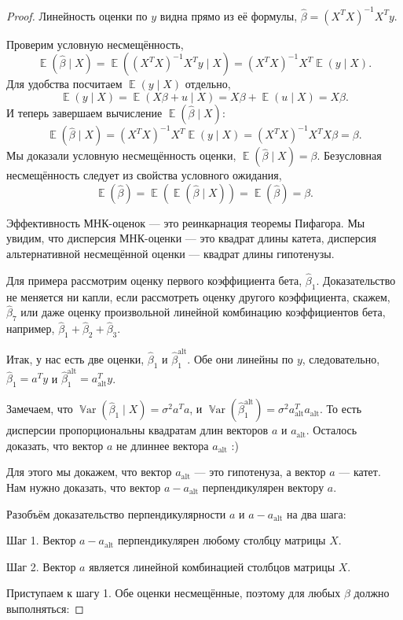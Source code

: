 \documentclass[12pt]{article}
\DeclareMathOperator{\Var}{\mathbb{V}ar}
\DeclareMathOperator{\E}{\mathbb{E}}
\newcommand{\hb}{\hat{\beta}}
\newcommand{\alt}{\text{alt}}
\begin{document}
\begin{proof}
Линейность оценки по $y$ видна прямо из её формулы, $\hb = (X^TX)^{-1}X^Ty$.

Проверим условную несмещённость, 
\[
\E(\hb \mid X) = \E((X^TX)^{-1}X^Ty \mid X) = (X^TX)^{-1}X^T\E(y \mid X).
\]
Для удобства посчитаем $\E(y \mid X)$ отдельно,
\[
\E(y \mid X) = \E(X\beta + u \mid X) = X\beta + \E(u \mid X) = X\beta.
\]
И теперь завершаем вычисление $\E(\hb \mid X)$:
\[
\E(\hb \mid X) = (X^TX)^{-1}X^T\E(y \mid X) = (X^TX)^{-1}X^TX\beta = \beta.
\]
Мы доказали условную несмещённость оценки, $\E(\hb \mid X) = \beta$.
Безусловная несмещённость следует из свойства условного ожидания,
\[
\E(\hb) = \E(\E(\hb \mid X)) = \E(\hb) = \beta.
\]

Эффективность МНК-оценок — это реинкарнация теоремы Пифагора. 
Мы увидим, что дисперсия МНК-оценки — это квадрат длины катета, 
дисперсия альтернативной несмещённой оценки — квадрат длины гипотенузы.

Для примера рассмотрим оценку первого коэффициента бета, $\hb_1$.
Доказательство не меняется ни капли, если рассмотреть оценку другого коэффициента, скажем, $\hb_7$ или даже оценку произвольной линейной комбинацию коэффициентов бета, например, $\hb_1 + \hb_2 + \hb_3$.

Итак, у нас есть две оценки, $\hb_1$ и $\hb_1^{\alt}$. 
Обе они линейны по $y$, следовательно, $\hb_1 = a^T y$ и $\hb_1^{\alt} = a^T_{\alt} y$.


Замечаем, что $\Var(\hb_1 \mid X) = \sigma^2 a^Ta$, и $\Var(\hb_1^{\alt}) = \sigma^2 a_{\alt}^Ta_{\alt}$. 
То есть дисперсии пропорциональны квадратам длин векторов $a$ и $a_{\alt}$. 
Осталось доказать, что вектор $a$ не длиннее вектора $a_{\alt}$ :)

Для этого мы докажем, что вектор $a_{\alt}$ — это гипотенуза, а вектор $a$ — катет. 
Нам нужно доказать, что вектор $a - a_{\alt}$ перпендикулярен вектору $a$.

Разобъём доказательство перпендикулярности $a$ и $a-a_{\alt}$ на два шага:

Шаг 1. Вектор $a - a_{\alt}$ перпендикулярен любому столбцу матрицы $X$.

Шаг 2. Вектор $a$ является линейной комбинацией столбцов матрицы $X$.






Приступаем к шагу 1. Обе оценки несмещённые, поэтому для любых $\beta$ должно выполняться:


\end{proof}
\end{document}
